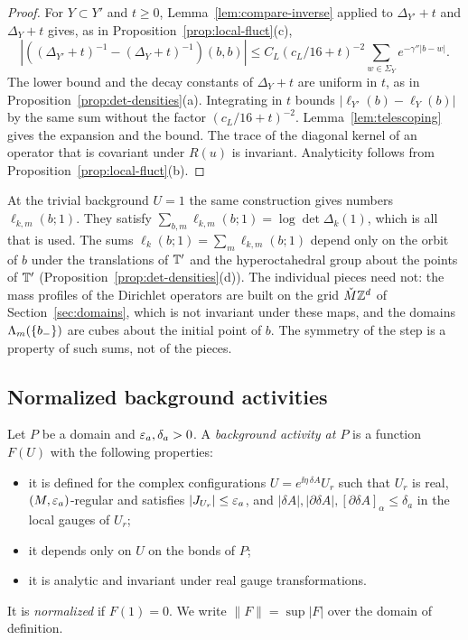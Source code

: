 \begin{proof}
For $Y\subset Y'$ and $t\ge0$, Lemma~\ref{lem:compare-inverse} applied to $\Delta_{Y'}+t$ and $\Delta_Y+t$ gives, as in Proposition~\ref{prop:local-fluct}(c),
\[
|((\Delta_{Y'}+t)^{-1}-(\Delta_Y+t)^{-1})(b,b)|\le C_L(c_L/16+t)^{-2}\sum_{w\in\Sigma_Y}e^{-\gamma''|b-w|} .
\]
The lower bound and the decay constants of $\Delta_Y+t$ are uniform in $t$, as in Proposition~\ref{prop:det-densities}(a). Integrating in $t$ bounds $|\ell_{Y'}(b)-\ell_Y(b)|$ by the same sum without the factor $(c_L/16+t)^{-2}$. Lemma~\ref{lem:telescoping} gives the expansion and the bound. The trace of the diagonal kernel of an operator that is covariant under $R(u)$ is invariant. Analyticity follows from Proposition~\ref{prop:local-fluct}(b).
\end{proof}

At the trivial background $U=1$ the same construction gives numbers $\ell_{k,m}(b;1)$. They satisfy $\sum_{b,m}\ell_{k,m}(b;1)=\log\det\Delta_k(1)$, which is all that is used. The sums $\ell_k(b;1)=\sum_m\ell_{k,m}(b;1)$ depend only on the orbit of $b$ under the translations of $\mathbb T'$ and the hyperoctahedral group about the points of $\mathbb T'$ (Proposition~\ref{prop:det-densities}(d)). The individual pieces need not: the mass profiles of the Dirichlet operators are built on the grid $\check M\mathbb Z^d$ of Section~\ref{sec:domains}, which is not invariant under these maps, and the domains $\Lambda_m(\{b_-\})$ are cubes about the initial point of $b$. The symmetry of the step is a property of such sums, not of the pieces.

\subsection{Normalized background activities}\label{ss:38.2}

\begin{definition}\label{def:bg-activity}
Let $P$ be a domain and $\varepsilon_a,\delta_a>0$. A \emph{background activity at $P$} is a function $F(U)$ with the following properties:
\begin{itemize}
\item it is defined for the complex configurations $U=e^{\ii\eta\,\delta\!A}U_r$ such that $U_r$ is real, $(M,\varepsilon_a)$-regular and satisfies $|J_{U_r}|\le\varepsilon_a$, and $|\delta\!A|,|\partial\delta\!A|,[\partial\delta\!A]_\alpha\le\delta_a$ in the local gauges of $U_r$;
\item it depends only on $U$ on the bonds of $P$;
\item it is analytic and invariant under real gauge transformations.
\end{itemize}
It is \emph{normalized} if $F(1)=0$. We write $\|F\|=\sup|F|$ over the domain of definition.
\end{definition}

